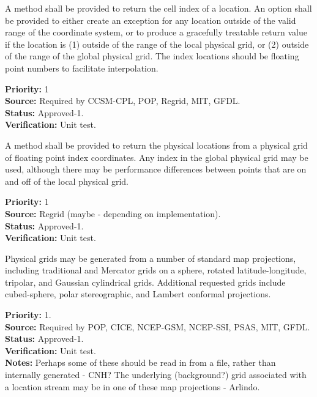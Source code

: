 A method shall be provided to return the cell index of a location.  An option shall
be provided to either create an exception for any location outside of the valid
range of the coordinate system, or to produce a gracefully treatable return value if
the location is (1) outside of the range of the local physical grid, or (2) outside of the
range of the global physical grid.  The index locations should be floating point numbers to
facilitate interpolation.
\begin{reqlist}
{\bf Priority:} 1\\
{\bf Source:} Required by CCSM-CPL, POP, Regrid, MIT, GFDL. \\
{\bf Status:} Approved-1. \\
{\bf Verification:} Unit test.
\end{reqlist}

A method shall be provided to return the physical locations from a physical grid of
floating point index coordinates.  Any index in the global physical grid may be
used, although there may be performance differences between points that are on
and off of the local physical grid.
\begin{reqlist}
{\bf Priority:} 1\\
{\bf Source:} Regrid (maybe - depending on implementation). \\
{\bf Status:} Approved-1. \\
{\bf Verification:} Unit test.
\end{reqlist}


Physical grids may be generated from a number of standard map projections, including
traditional and Mercator grids on a sphere, rotated latitude-longitude,
tripolar, and Gaussian cylindrical grids.  Additional requested grids include 
cubed-sphere, polar stereographic, and Lambert conformal projections.
\begin{reqlist}
{\bf Priority:} 1. \\
{\bf Source:} Required by POP, CICE, NCEP-GSM, NCEP-SSI,
PSAS, MIT, GFDL. \\
{\bf Status:} Approved-1. \\
{\bf Verification:} Unit test.\\
{\bf Notes:}  Perhaps some of these should be read in from a file, rather than
internally generated - CNH?  The underlying (background?) grid associated with a location stream may be in one of these map projections - Arlindo.
\end{reqlist}

